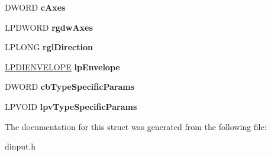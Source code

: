 \begin{DoxyCompactItemize}
\item 
\hypertarget{struct_d_i_e_f_f_e_c_t___d_x5_a04c00e83549c49f92c375d4c1d80d412}{D\-W\-O\-R\-D {\bfseries c\-Axes}}\label{struct_d_i_e_f_f_e_c_t___d_x5_a04c00e83549c49f92c375d4c1d80d412}

\item 
\hypertarget{struct_d_i_e_f_f_e_c_t___d_x5_a141a8f82ab8514d401a3c46d77e2f61f}{L\-P\-D\-W\-O\-R\-D {\bfseries rgdw\-Axes}}\label{struct_d_i_e_f_f_e_c_t___d_x5_a141a8f82ab8514d401a3c46d77e2f61f}

\item 
\hypertarget{struct_d_i_e_f_f_e_c_t___d_x5_ac19b69a1b9fdf60d3d3c359b33e7b7a7}{L\-P\-L\-O\-N\-G {\bfseries rgl\-Direction}}\label{struct_d_i_e_f_f_e_c_t___d_x5_ac19b69a1b9fdf60d3d3c359b33e7b7a7}

\item 
\hypertarget{struct_d_i_e_f_f_e_c_t___d_x5_ab9f3a02992b907073831f93b6e55fae3}{\hyperlink{struct_d_i_e_n_v_e_l_o_p_e}{L\-P\-D\-I\-E\-N\-V\-E\-L\-O\-P\-E} {\bfseries lp\-Envelope}}\label{struct_d_i_e_f_f_e_c_t___d_x5_ab9f3a02992b907073831f93b6e55fae3}

\item 
\hypertarget{struct_d_i_e_f_f_e_c_t___d_x5_a4bff6ac202069c80396955e7a4244ca2}{D\-W\-O\-R\-D {\bfseries cb\-Type\-Specific\-Params}}\label{struct_d_i_e_f_f_e_c_t___d_x5_a4bff6ac202069c80396955e7a4244ca2}

\item 
\hypertarget{struct_d_i_e_f_f_e_c_t___d_x5_a6fb296f4567fc5724f77c4fed5ba983e}{L\-P\-V\-O\-I\-D {\bfseries lpv\-Type\-Specific\-Params}}\label{struct_d_i_e_f_f_e_c_t___d_x5_a6fb296f4567fc5724f77c4fed5ba983e}

\end{DoxyCompactItemize}


The documentation for this struct was generated from the following file\-:\begin{DoxyCompactItemize}
\item 
dinput.\-h\end{DoxyCompactItemize}
